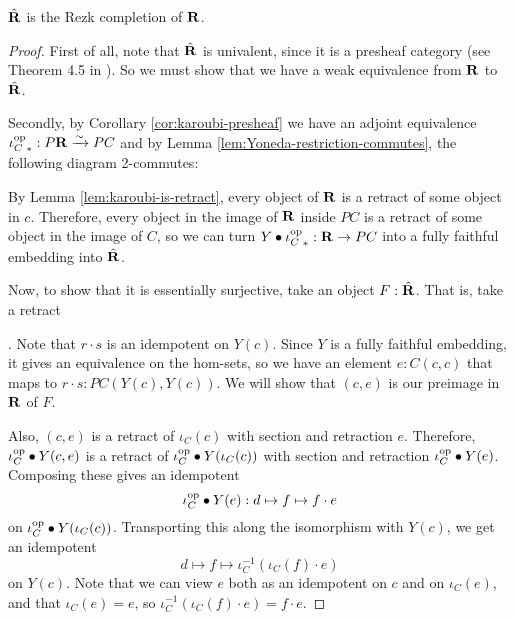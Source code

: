 \begin{lemma}
  $ \hat {\mathbf{R}} $ is the Rezk completion of $ \mathbf{R} $.
\end{lemma}
\begin{proof}
  First of all, note that $ \hat {\mathbf{R}} $ is univalent, since it is a presheaf category (see Theorem 4.5 in \cite{univalent-categories}). So we must show that we have a weak equivalence from $ \mathbf{R} $ to $ \hat {\mathbf{R}} $.

  Secondly, by Corollary \ref{cor:karoubi-presheaf} we have an adjoint equivalence $ {\iota_C^{\text{op}}}_*: P \mathbf{R} \xrightarrow \sim P C $ and by Lemma \ref{lem:Yoneda-restriction-commutes}, the following diagram 2-commutes:
  \begin{center}
  \end{center}

  By Lemma \ref{lem:karoubi-is-retract}, every object of $ \mathbf{R} $ is a retract of some object in $ c $. Therefore, every object in the image of $ \mathbf{R} $ inside $ P C $ is a retract of some object in the image of $ C $, so we can turn $ Y \bullet {\ensuremath{\iota_C^{\text{op}}}}_* : \mathbf{R} \to P C $ into a fully faithful embedding into $ \hat {\mathbf{R}} $.

  Now, to show that it is essentially surjective, take an object $ F : \hat {\mathbf{R}} $. That is, take a retract . Note that $ r \cdot s $ is an idempotent on $ Y(c) $. Since $ Y $ is a fully faithful embedding, it gives an equivalence on the hom-sets, so we have an element $ e : C(c, c) $ that maps to $ r \cdot s : P C (Y(c), Y(c)) $. We will show that $ (c, e) $ is our preimage in $ \mathbf{R} $ of $ F $.

  Also, $ (c, e) $ is a retract of $ \iota_C(c) $ with section and retraction $ e $. Therefore, $ \iota_C^{\text{op}} \bullet Y(c, e) $ is a retract of $ \iota_C^{\text{op}} \bullet Y (\iota_C (c)) $ with section and retraction $ \iota_C^{\text{op}} \bullet Y(e) $. Composing these gives an idempotent
  \[ \iota_C^{\text{op}} \bullet Y(e): d \mapsto f \mapsto f \cdot e \]
  on $ \iota_C^{\text{op}} \bullet Y (\iota_C (c)) $. Transporting this along the isomorphism with $ Y(c) $, we get an idempotent
  \[ d \mapsto f \mapsto \iota_C^{-1}(\iota_C(f) \cdot e) \]
  on $ Y(c) $. Note that we can view $ e $ both as an idempotent on $ c $ and on $ \iota_C(e) $, and that $ \iota_C(e) = e $, so $ \iota_C^{-1}(\iota_C(f) \cdot e) = f \cdot e $.


\end{proof}
